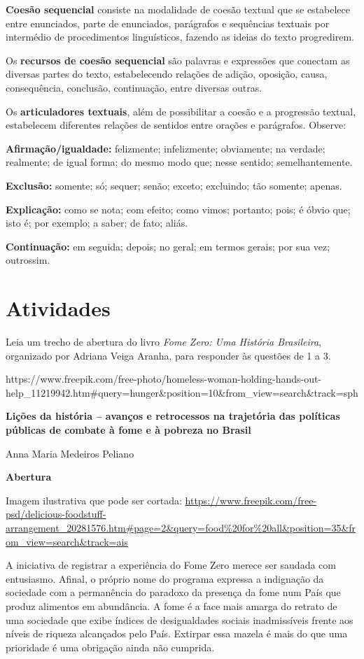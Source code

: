 \begin{itemize}
\begin{itemize}
{\textbf{Coesão sequencial} consiste na modalidade de coesão textual que
se estabelece entre enunciados, parte de enunciados, parágrafos e
sequências textuais por intermédio de procedimentos linguísticos,
fazendo as ideias do texto progredirem.

Os \textbf{recursos de coesão sequencial} são palavras e expressões que
conectam as diversas partes do texto, estabelecendo relações de adição,
oposição, causa, consequência, conclusão, continuação, entre diversas
outras.

Os \textbf{articuladores textuais}, além de possibilitar a coesão e a
progressão textual, estabelecem diferentes relações de sentidos entre
orações e parágrafos. Observe:

\textbf{Afirmação/igualdade:} felizmente; infelizmente; obviamente; na
verdade; realmente; de igual forma; do mesmo modo que; nesse sentido;
semelhantemente.

\textbf{Exclusão:} somente; só; sequer; senão; exceto; excluindo; tão
somente; apenas.

\textbf{Explicação:} como se nota; com efeito; como vimos; portanto;
pois; é óbvio que; isto é; por exemplo; a saber; de fato; aliás.

\textbf{Continuação:} em seguida; depois; no geral; em termos gerais;
por sua vez; outrossim.
}

\section{Atividades}

Leia um trecho de abertura do livro \emph{Fome Zero: Uma História
Brasileira}, organizado por Adriana Veiga Aranha, para responder às
questões de 1 a 3.

https://www.freepik.com/free-photo/homeless-woman-holding-hands-out-help\_11219942.htm\#query=hunger\&position=10\&from\_view=search\&track=sph

\textbf{Lições da história -- avanços e retrocessos na trajetória das
políticas públicas de combate à fome e à pobreza no Brasil}

Anna Maria Medeiros Peliano

\textbf{Abertura}

Imagem ilustrativa que pode ser cortada:
\url{https://www.freepik.com/free-psd/delicious-foodstuff-arrangement_20281576.htm\#page=2\&query=food\%20for\%20all\&position=35\&from_view=search\&track=ais}

A iniciativa de registrar a experiência do Fome Zero merece ser saudada
com entusiasmo. Afinal, o próprio nome do programa expressa a indignação
da sociedade com a permanência do paradoxo da presença da fome num País
que produz alimentos em abundância. A fome é a face mais amarga do
retrato de uma sociedade que exibe índices de desigualdades sociais
inadmissíveis frente aos níveis de riqueza alcançados pelo País.
Extirpar essa mazela é mais do que uma prioridade é uma obrigação ainda
não cumprida.


\end{itemize}
\end{itemize}
